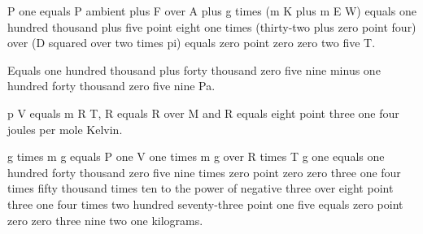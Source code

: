 P one equals P ambient plus F over A plus g times (m K plus m E W) equals one hundred thousand plus five point eight one times (thirty-two plus zero point four) over (D squared over two times pi) equals zero point zero zero two five T.

Equals one hundred thousand plus forty thousand zero five nine minus one hundred forty thousand zero five nine Pa.

p V equals m R T, R equals R over M and R equals eight point three one four joules per mole Kelvin.

g times m g equals P one V one times m g over R times T g one equals one hundred forty thousand zero five nine times zero point zero zero three one four times fifty thousand times ten to the power of negative three over eight point three one four times two hundred seventy-three point one five equals zero point zero zero three nine two one kilograms.